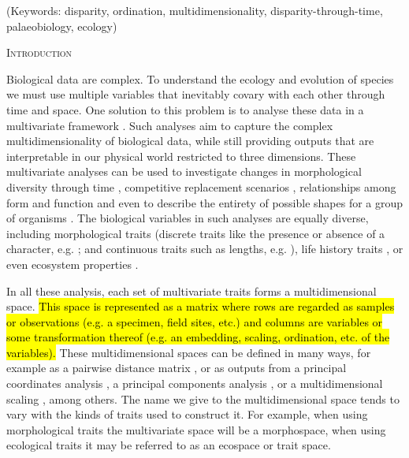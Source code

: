 \documentclass[12pt,letterpaper]{article}
\renewcommand{\section}[1]{%
\bigskip
\begin{center}
\begin{Large}
\normalfont\scshape #1
\medskip
\end{Large}
\end{center}}
\begin{document}
\noindent (Keywords: disparity, ordination, multidimensionality, disparity-through-time, palaeobiology, ecology)\\

\vspace{1.5in}

\newpage 

%
%

\section{Introduction}

Biological data are complex.
To understand the ecology and evolution of species we must use multiple variables that inevitably covary with each other through time and space.
One solution to this problem is to analyse these data in a multivariate framework \citep[e.g.][]{price2015predation,diaz2016global}.
Such analyses aim to capture the complex multidimensionality of biological data, while still providing outputs that are interpretable in our physical world restricted to three dimensions.
These multivariate analyses can be used to investigate changes in morphological diversity through time \citep{Close2015}, competitive replacement scenarios \citep{Brusatte12092008}, relationships among form and function \citep{diaz2016global} and even to describe the entirety of possible shapes for a group of organisms \citep{raup1966geometric}.
The biological variables in such analyses are equally diverse, including morphological traits (discrete traits like the presence or absence of a character, e.g. \citealt{brusattedinosaur2012}; and continuous traits such as lengths, e.g. \citealt{price2015predation}), life history traits \citep[e.g.][]{diaz2016global}, or even ecosystem properties \citep[e.g.][]{DonohueDim}. 

In all these analysis, each set of multivariate traits forms a multidimensional space.
\hl{This space is represented as a matrix where rows are regarded as samples or observations (e.g. a specimen, field sites, etc.) and columns are variables or some transformation thereof (e.g. an embedding, scaling, ordination, etc. of the variables).}
These multidimensional spaces can be defined in many ways, for example as a pairwise distance matrix \citep[][and references therein]{lloyd2016estimating}, or as outputs from a principal coordinates analysis \citep[PCO;][]{Brusatte12092008}, a principal components analysis \citep[PCA;][]{zelditch2012geometric}, or a multidimensional scaling \citep[MDS;][]{DonohueDim}, among others.
The name we give to the multidimensional space tends to vary with the kinds of traits used to construct it. 
For example, when using morphological traits the multivariate space will be a morphospace, when using ecological traits it may be referred to as an ecospace or trait space.
\end{document}
